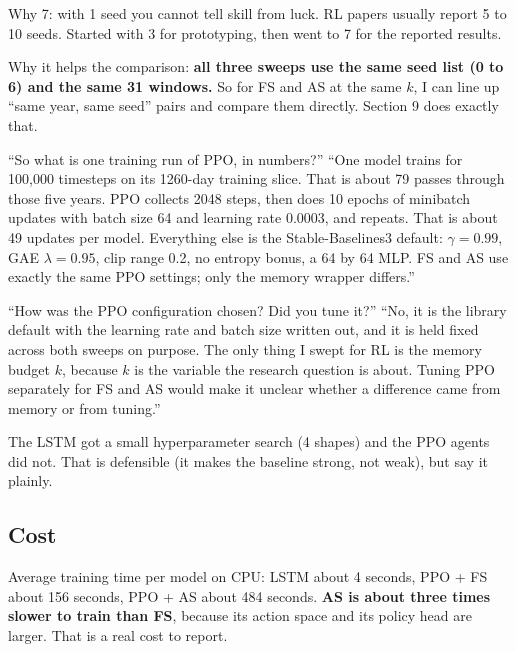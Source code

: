 \documentclass[11pt,a4paper]{article}
\begin{document}
Why 7: with 1 seed you cannot tell skill from luck. RL papers usually report 5 to 10 seeds.
Started with 3 for prototyping, then went to 7 for the reported results.

Why it helps the comparison: \textbf{all three sweeps use the same seed list (0 to 6) and the
same 31 windows.} So for FS and AS at the same $k$, I can line up ``same year, same seed''
pairs and compare them directly. Section 9 does exactly that.

\begin{qa}{``So what is one training run of PPO, in numbers?''}
``One model trains for 100,000 timesteps on its 1260-day training slice. That is about 79
passes through those five years. PPO collects 2048 steps, then does 10 epochs of minibatch
updates with batch size 64 and learning rate 0.0003, and repeats. That is about 49 updates
per model. Everything else is the Stable-Baselines3 default: $\gamma=0.99$, GAE $\lambda=0.95$,
clip range 0.2, no entropy bonus, a 64 by 64 MLP. FS and AS use exactly the same PPO
settings; only the memory wrapper differs.''
\end{qa}

\begin{qa}{``How was the PPO configuration chosen? Did you tune it?''}
``No, it is the library default with the learning rate and batch size written out, and it is
held fixed across both sweeps on purpose. The only thing I swept for RL is the memory budget
$k$, because $k$ is the variable the research question is about. Tuning PPO separately for FS
and AS would make it unclear whether a difference came from memory or from tuning.''
\end{qa}

\begin{honest}
The LSTM got a small hyperparameter search (4 shapes) and the PPO agents did not. That is
defensible (it makes the baseline strong, not weak), but say it plainly.
\end{honest}

\subsection{Cost}
Average training time per model on CPU: LSTM about 4 seconds, PPO + FS about 156 seconds,
PPO + AS about 484 seconds. \textbf{AS is about three times slower to train than FS}, because
its action space and its policy head are larger. That is a real cost to report.

\end{document}
